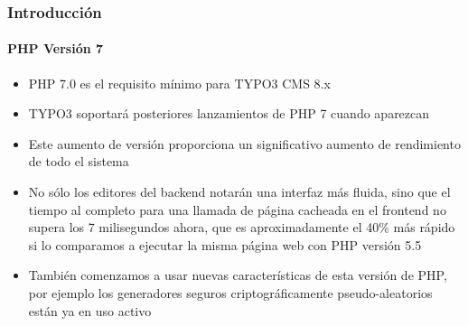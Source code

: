 \begin{frame}[fragile]
	\frametitle{Introducción}
	\framesubtitle{PHP Versión 7}

	\begin{itemize}

		\item PHP 7.0 es el requisito mínimo para TYPO3 CMS 8.x
		\item TYPO3 soportará posteriores lanzamientos de PHP 7 cuando aparezcan
		\item Este aumento de versión proporciona un significativo aumento de rendimiento de todo el sistema

		\item No sólo los editores del backend notarán una interfaz más fluida, sino que el
			tiempo al completo para una llamada de página cacheada en el frontend no supera los
			7 milisegundos ahora, que es aproximadamente el 40\% más rápido si lo comparamos a ejecutar
			la misma página web con PHP versión 5.5

		\item También comenzamos a usar nuevas características de esta versión de PHP, por ejemplo
			los generadores seguros criptográficamente pseudo-aleatorios están ya en uso activo

	\end{itemize}

\end{frame}

